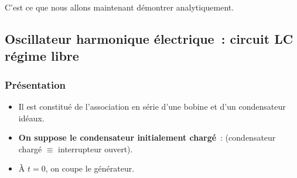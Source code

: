 \documentclass[../../main/main.tex]{subfiles}
\begin{document}
C'est ce que nous allons maintenant démontrer analytiquement.

\subsection{Oscillateur harmonique électrique~: circuit LC régime
	libre}\label{sec:lclibre}

\subsubsection{Présentation}

\begin{minipage}[c]{.6\linewidth}
	\begin{itemize}
		\item Il est constitué de l'association en série d'une bobine et d'un
		      condensateur idéaux.
		\item \textbf{On suppose le condensateur initialement chargé}~:
		       (condensateur chargé
		      $\equiv$ interrupteur ouvert).
		\item À $t=0$, on coupe le générateur.
	\end{itemize}
\end{minipage}
\hfill
\begin{minipage}[c]{.35\linewidth}
	~
	\begin{center}
	\end{center}
\end{minipage}
\end{document}
